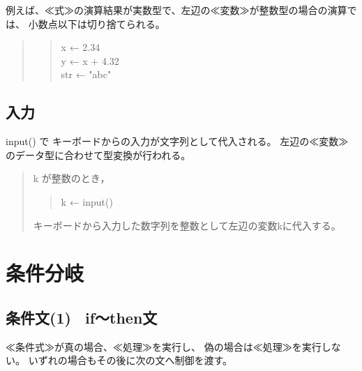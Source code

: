 \documentclass[11pt,a4j]{jarticle}
\begin{document}
例えば、≪式≫の演算結果が実数型で、左辺の≪変数≫が整数型の場合の演算では、
小数点以下は切り捨てられる。
\begin{quotation}
\noindent [使用例]
\begin{quotation}
\noindent x ← 2.34\\
y ← x + 4.32\\
str ← "abc"
\end{quotation}
\end{quotation}

\vspace{-6mm}
\subsection{入力}
\begin{quotation}
\end{quotation}
input() で キーボードからの入力が文字列として代入される。
左辺の≪変数≫のデータ型に合わせて型変換が行われる。

\begin{quotation}
\noindent [使用例] k が整数のとき，
\begin{quotation}
\noindent 
k ← input()
\end{quotation}
キーボードから入力した数字列を整数として左辺の変数kに代入する。
\end{quotation}


\vspace{-5mm}
\section{条件分岐}
\subsection{条件文(1) \ if〜then文}
\begin{quotation}
\end{quotation}
≪条件式≫が真の場合、≪処理≫を実行し、
偽の場合は≪処理≫を実行しない。
いずれの場合もその後に次の文へ制御を渡す。
\end{document}
